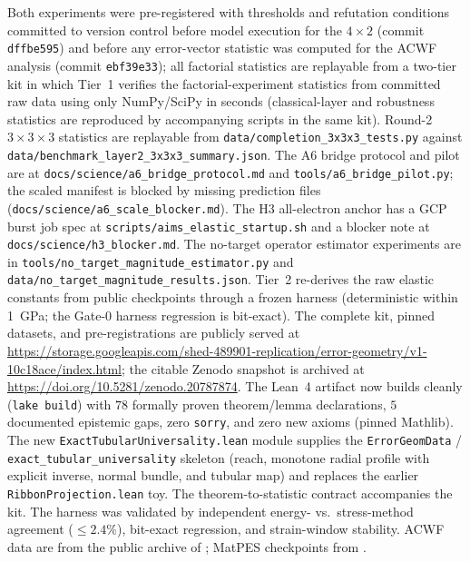 \documentclass[11pt]{article}
\theoremstyle{remark}
\begin{document}
\begin{sloppypar}
Both experiments were pre-registered with thresholds and refutation
conditions committed to version control before model execution for the
$4{\times}2$ (commit \texttt{dffbe595}) and before any error-vector statistic
was computed for the ACWF analysis (commit \texttt{ebf39e33}); all factorial
statistics are replayable from a two-tier kit in which Tier~1 verifies the
factorial-experiment statistics from committed raw data using only
NumPy/SciPy in seconds (classical-layer and robustness statistics are
reproduced by accompanying scripts in the same kit). Round-2 $3{\times}3{\times}3$
statistics are replayable from \texttt{data/completion\_3x3x3\_tests.py} against
\texttt{data/benchmark\_layer2\_3x3x3\_summary.json}. The A6 bridge protocol and
pilot are at \texttt{docs/science/a6\_bridge\_protocol.md} and
\texttt{tools/a6\_bridge\_pilot.py}; the scaled manifest is blocked by missing
prediction files (\texttt{docs/science/a6\_scale\_blocker.md}). The H3
all-electron anchor has a GCP burst job spec at
\texttt{scripts/aims\_elastic\_startup.sh} and a blocker note at
\texttt{docs/science/h3\_blocker.md}. The no-target operator estimator
experiments are in \texttt{tools/no\_target\_magnitude\_estimator.py} and
\texttt{data/no\_target\_magnitude\_results.json}. Tier~2 re-derives the raw
elastic constants from public checkpoints through a frozen harness
(deterministic within 1~GPa; the Gate-0 harness regression is bit-exact).
The complete kit, pinned datasets, and pre-registrations are publicly served
at \url{https://storage.googleapis.com/shed-489901-replication/error-geometry/v1-10c18ace/index.html};
the citable Zenodo snapshot is archived at
\url{https://doi.org/10.5281/zenodo.20787874}.
The Lean~4 artifact now builds cleanly (\texttt{lake build}) with $78$
formally proven theorem/lemma declarations, $5$ documented epistemic gaps,
zero \texttt{sorry}, and zero new axioms (pinned Mathlib). The new
\texttt{ExactTubularUniversality.lean} module supplies the
\texttt{ErrorGeomData} / \texttt{exact\_tubular\_universality} skeleton
(reach, monotone radial profile with explicit inverse, normal bundle, and
tubular map) and replaces the earlier \texttt{RibbonProjection.lean} toy. The
theorem-to-statistic contract accompanies the kit. The harness was validated by independent energy- vs.\ stress-method
agreement ($\le 2.4\%$), bit-exact regression, and strain-window stability.
ACWF data are from the public archive of \citep{bosoni2024}; MatPES
checkpoints from \citep{kaplan2025}.
\end{sloppypar}
\end{document}
